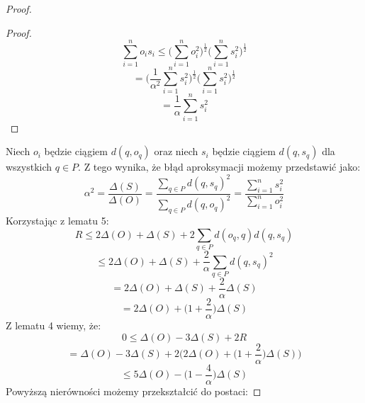 \begin{proof}
\begin{proof}
\begin{equation}
            \sum_{i=1}^{n} o_{i} s_{i} \leq \Big( \sum_{i=1}^{n} o_{i}^{2} \Big)^{\frac{1}{2}} \Big( \sum_{i=1}^{n} s_{i}^{2} \Big)^{\frac{1}{2}}
        \end{equation}
        \begin{equation}
            = \Big( \frac{1}{\alpha^{2}}\sum_{i=1}^{n} s_{i}^{2} \Big)^{\frac{1}{2}} \Big( \sum_{i=1}^{n} s_{i}^{2} \Big)^{\frac{1}{2}}
        \end{equation}
        \begin{equation}
            = \frac{1}{\alpha} \sum_{i=1}^{n} s_{i}^{2}
        \end{equation}
    \end{proof}
    Niech $o_{i}$ będzie ciągiem $d(q, o_{q})$ oraz niech $s_{i}$ będzie ciągiem $d(q,s_{q})$ dla wszystkich $q \in P$.
    Z tego wynika, że błąd aproksymacji możemy przedstawić jako:
    \begin{equation}
        \alpha^{2} = \frac{\Delta(S)}{\Delta(O)} = \frac{\sum_{q \in P} d(q,s_{q})^{2}}{\sum_{q \in P} d(q,o_{q})^{2}} =\frac{\sum_{i=1}^{n} s_{i}^{2}}{\sum_{i=1}^{n} o_{i}^{2}}
    \end{equation}
    Korzystając z lematu 5:
    \begin{equation}
        R \leq 2\Delta(O) + \Delta(S) + 2\sum_{q \in P} d(o_{q}, q)d(q, s_{q}) 
    \end{equation}
    \begin{equation}
        \leq 2\Delta(O) + \Delta(S) + \frac{2}{\alpha}\sum_{q \in P} d(q, s_{q})^{2} 
    \end{equation}
    \begin{equation}
        = 2\Delta(O) + \Delta(S) + \frac{2}{\alpha}\Delta(S)
    \end{equation}
    \begin{equation}
        = 2\Delta(O) + \Big(1 + \frac{2}{\alpha} \Big)\Delta(S)
    \end{equation}
    Z lematu 4 wiemy, że:
    \begin{equation}
        0 \leq \Delta(O) - 3\Delta(S) + 2R
    \end{equation}
    \begin{equation}
        = \Delta(O) - 3\Delta(S) + 2\Big(2\Delta(O) + \Big(1 + \frac{2}{\alpha} \Big)\Delta(S)\Big)
    \end{equation}
    \begin{equation}
        \leq 5\Delta(O) - \Big(1 - \frac{4}{\alpha} \Big)\Delta(S)
    \end{equation}
    Powyższą nierówności możemy przekształcić do postaci:

\end{proof}

